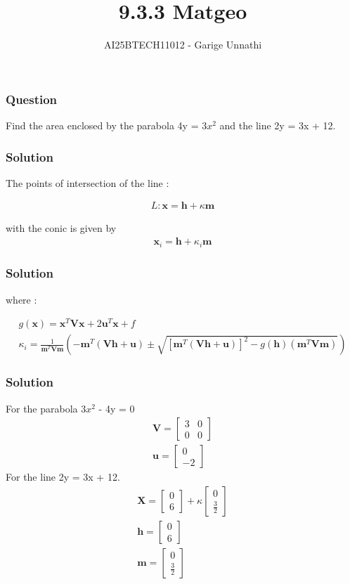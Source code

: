 \documentclass{beamer}
\title{9.3.3 Matgeo}
\author{AI25BTECH11012 - Garige Unnathi}
\date{}
\begin{document}
\frame{\titlepage}

\begin{frame}
\frametitle{Question}
Find the area enclosed by the parabola 4y = 3$x^2$ and the line 2y = 3x + 12.\\
\end{frame}


\begin{frame}
\frametitle{Solution}
The points of intersection of the line :

\begin{align}
  L : \textbf{x} = \textbf{h} + \kappa\textbf{m}
\end{align}

with the conic  is given by 
\begin{align}
   \textbf{x}_i = \textbf{h} + \kappa_i\textbf{m}
\end{align}
\end{frame}


\begin{frame}
\frametitle{Solution}
where :

\begin{align}
 g(\textbf{x}) = \textbf{x}^{T}\textbf{V}\textbf{x} + 2\textbf{u}^{T}\textbf{x} + f \\
\kappa_i = \frac{1}
{\textbf{m}^{T}\textbf{V}\textbf{m}}(-\textbf{m}^{T}(\textbf{V}\textbf{h} + \textbf{u}) \pm \sqrt{[\textbf{m}^{T}(\textbf{V}\textbf{h}+\textbf{u})]^{2} - g(\textbf{h})(\textbf{m}^{T}\textbf{V}\textbf{m})})
\end{align}
\end{frame}


\begin{frame}
\frametitle{Solution}
For the parabola 3$x^2$ - 4y = 0
\begin{align}
   \textbf{V} = \begin{bmatrix}3 & 0\\0& 0\end{bmatrix}\\
   \textbf{u} = \begin{bmatrix}0\\-2\end{bmatrix}
\end{align}
For the line  2y = 3x + 12.
\begin{align}
  \textbf{X} = \begin{bmatrix}0\\6\end{bmatrix} + \kappa\begin{bmatrix}0 \\ \frac{3}{2}\end{bmatrix}\\
  \textbf{h} = \begin{bmatrix}0\\6\end{bmatrix}\\
  \textbf{m} = \begin{bmatrix}0 \\ \frac{3}{2}\end{bmatrix}
\end{align}
\end{frame}
\end{document}
